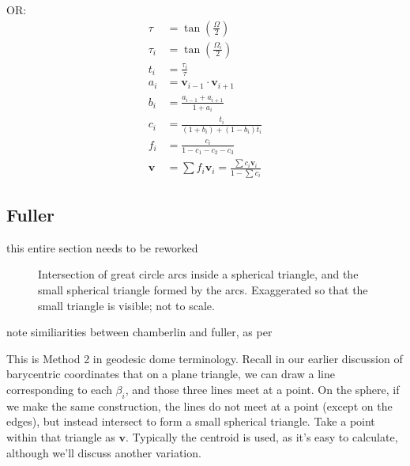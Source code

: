 \documentclass{amsart}[12pt]
\begin{document}
OR:
\begin{equation}\begin{split}
\tau   &= \tan\left(\frac{\Omega}{2}\right) \\
\tau_i &= \tan\left(\frac{\Omega_i}{2}\right) \\
t_i &= \frac{\tau_i}{\tau} \\
a_i &= \mathbf v_{i-1} \cdot \mathbf v_{i+1} \\
b_i &= \frac{a_{i-1} + a_{i+1}}{1 + a_i} \\
c_i &= \frac{t_i}{(1+b_i) + (1-b_i) t_i} \\
f_i &= \frac{c_i}{1 - c_1 - c_2 - c_3} \\
\mathbf v &= \sum f_i \mathbf v_i = \frac{\sum c_i \mathbf v_i }{ 1 - \sum c_i }
\end{split}\end{equation}

\subsection{Fuller}
this entire section needs to be reworked\cite{crider08}
\begin{figure}%
\caption{Intersection of great circle arcs inside a spherical triangle,
and the small spherical triangle formed by the arcs. Exaggerated so that the
small triangle is visible; not to scale.}
\label{fig:intlines}
\end{figure}
note similiarities between chamberlin and fuller, as per \cite{gray94}

This is Method 2 in geodesic dome terminology. Recall in our earlier discussion
of barycentric coordinates that on a plane triangle, we can draw a line
corresponding to each $\beta_i$, and those three lines meet at a point. On the
sphere, if we make the same construction, the lines do not meet at a point
(except on the edges), but instead intersect to form a small spherical
triangle. Take a point within that triangle as $\mathbf v$.
Typically the centroid is used, as it's easy to calculate,
although we'll discuss another variation.
\end{document}
